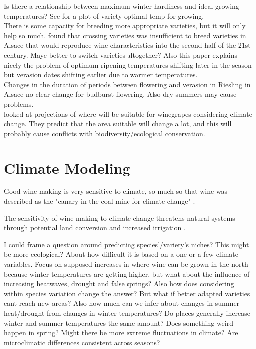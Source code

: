 \documentclass[11pt,letter]{article}
\begin{document}
Is there a relationship between maximum winter hardiness and ideal growing temperatures? See \cite{Ashenfelter2016} for a plot of variety optimal temp for growing. \\

There is some capacity for breeding more appropriate varieties, but it will only help so much. \cite{Duchene2010} found that crossing varieties was insufficient to breed varieties in Alsace that would reproduce wine characteristics into the second half of the 21st century. Maye better to switch varieties altogether? Also this paper explains nicely the problem of optimum ripening temperatures shifting later in the season but verasion dates shifting earlier due to warmer temperatures. \\ 

Changes in the duration of periods between flowering and verasion in Riesling in Alsace \citep{Duchene2005} no clear change for budburst-flowering. Also dry summers may cause problems. \\

\cite{Hannah2013} looked at projections of where will be suitable for winegrapes considering climate change. They predict that the area suitable will change a lot, and this will probably cause conflicts with biodiversity/ecological conservation. \\

\section{Climate Modeling}

Good wine making is very sensitive to climate, so much so that wine was described as the "canary in the coal mine for climate change" \citep{Goode2012}.

The sensitivity of wine making to climate change threatens natural systems through potential land conversion and increased irrigation \citep{Hannah2013}.

I could frame a question around predicting species’/variety's niches? This might be more ecological? About how difficult it is based on a one or a few climate variables. Focus on supposed increases in where wine can be grown in the north because winter temperatures are getting higher, but what about the influence of increasing heatwaves, drought and false springs? Also how does considering within species variation change the answer? But what if better adapted varieties cant reach new areas? Also how much can we infer about changes in summer heat/drought from changes in winter temperatures? Do places generally increase winter and summer temperatures the same amount? Does something weird happen in spring? Might there be more extreme fluctuations in climate? Are microclimatic differences consistent across seasons? \\
\end{document}
